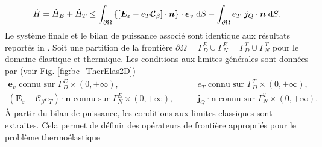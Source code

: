 \begin{equation*}
\begin{aligned}
\dot{H} = \dot{H}_E + \dot{H}_T \le \int_{\partial \Omega} \left\{\left[\bm{E}_\varepsilon - e_T \bm{\mathcal{C}}_\beta \right] \cdot \bm{n}\right\}  \cdot \bm{e}_v  \d{S} - \int_{\partial\Omega} e_T \ \bm{j}_Q \cdot \bm{n} \d{S}.
\end{aligned}
\end{equation*}
Le système finale et le bilan de puissance associé sont identique aux résultats reportés in \cite[page 326, 332]{carlson1973}. Soit une partition de la frontière $\partial \Omega = \Gamma_D^E \cup \Gamma_N^E = \Gamma_D^T \cup \Gamma_N^T$ pour le domaine élastique et thermique. Les conditions aux limites générales sont données par (voir Fig. \ref{fig:bc_TherElas2D})
\begin{equation*}
\begin{aligned}
\bm{e}_v \text{ connu sur } \Gamma_D^E \times (0, +\infty), \\
(\bm{E}_\varepsilon - \bm{\mathcal{C}}_\beta e_T) \cdot \bm{n} \text{ connu sur } \Gamma_N^E \times (0, +\infty), 
\end{aligned} \qquad
\begin{aligned}
e_T \text{ connu sur } \Gamma_D^T \times (0, +\infty), \\
\bm{j}_Q \cdot \bm{n} \text{ connu sur } \Gamma_N^T \times (0, +\infty).
\end{aligned}
\end{equation*}
À partir du bilan de puissance, les conditions aux limites classiques sont extraites. Cela permet de définir des opérateurs de frontière appropriés pour le problème thermoélastique
